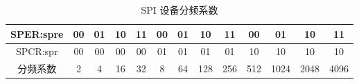 \begin{table}
  \centering
  \begin{tabular}{*{13}{|c}|} \hline
    SPER:spre & 00 & 01 & 10 & 11 & 00 & 01 & 10 & 11 & 00 & 01 & 10 & 11 \\ \hline
    SPCR:spr  & 00 & 00 & 00 & 00 & 01 & 01 & 01 & 01 & 10 & 10 & 10 & 10 \\ \hline
    分频系数 & 2 & 4 & 16 & 32 & 8 & 64 & 128 & 256 & 512 & 1024 & 2048 & 4096 \\ \hline
  \end{tabular}
  \caption{SPI 设备分频系数}
  \label{tab:SPIFreqTable}
\end{table}

